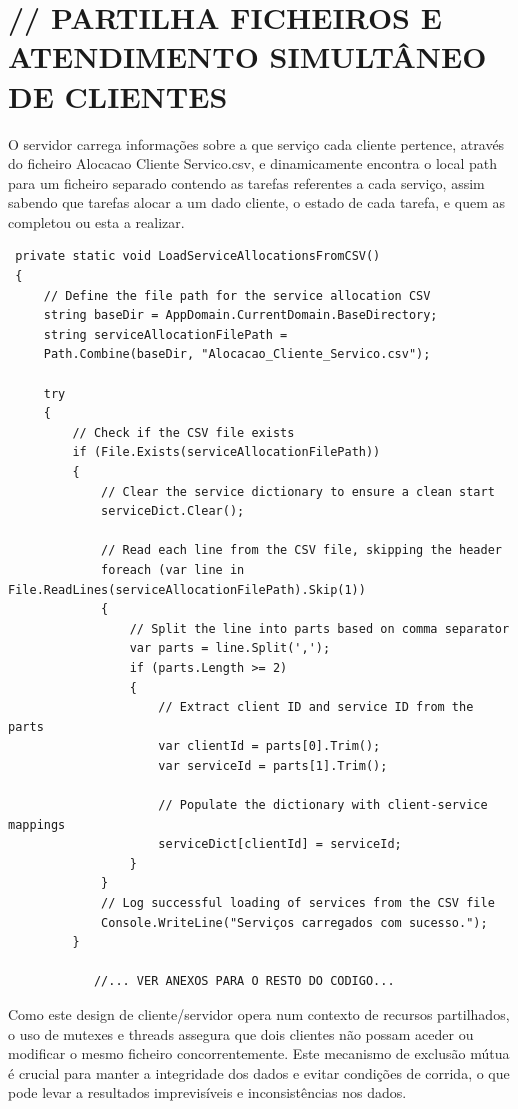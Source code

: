 \documentclass[12pt]{article}
\begin{document}
\section{// PARTILHA FICHEIROS E ATENDIMENTO SIMULTÂNEO DE CLIENTES}
\noindent O servidor carrega informações sobre a que serviço cada cliente pertence, através do ficheiro Alocacao Cliente Servico.csv,  e dinamicamente encontra o local path para um ficheiro separado contendo as tarefas referentes a cada serviço, assim sabendo que tarefas alocar a um dado cliente, o estado de cada tarefa, e quem as completou ou esta a realizar.\\
\begin{verbatim}
 private static void LoadServiceAllocationsFromCSV()
 {
     // Define the file path for the service allocation CSV
     string baseDir = AppDomain.CurrentDomain.BaseDirectory;
     string serviceAllocationFilePath = 
     Path.Combine(baseDir, "Alocacao_Cliente_Servico.csv");

     try
     {
         // Check if the CSV file exists
         if (File.Exists(serviceAllocationFilePath))
         {
             // Clear the service dictionary to ensure a clean start
             serviceDict.Clear();

             // Read each line from the CSV file, skipping the header
             foreach (var line in File.ReadLines(serviceAllocationFilePath).Skip(1))
             {
                 // Split the line into parts based on comma separator
                 var parts = line.Split(',');
                 if (parts.Length >= 2)
                 {
                     // Extract client ID and service ID from the parts
                     var clientId = parts[0].Trim();
                     var serviceId = parts[1].Trim();

                     // Populate the dictionary with client-service mappings
                     serviceDict[clientId] = serviceId;
                 }
             }
             // Log successful loading of services from the CSV file
             Console.WriteLine("Serviços carregados com sucesso.");
         }
         
			//... VER ANEXOS PARA O RESTO DO CODIGO...
\end{verbatim}

\noindent Como este design de cliente/servidor opera num contexto de recursos partilhados, o uso de mutexes e threads assegura que dois clientes não possam aceder ou modificar o mesmo ficheiro concorrentemente. Este mecanismo de exclusão mútua é crucial para manter a integridade dos dados e evitar condições de corrida, o que pode levar a resultados imprevisíveis e inconsistências nos dados.\\
\end{document}
